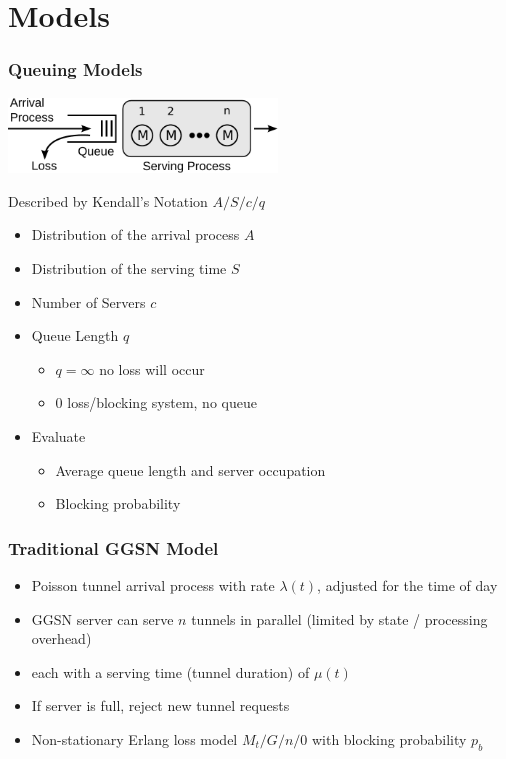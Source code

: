 \documentclass{beamer}
\begin{document}
\section{Models}

\begin{frame}
	\frametitle{Queuing Models}

	\begin{center}
		\includegraphics[height=2cm]{figures/kendall-model.pdf}
	\end{center}

	Described by Kendall's Notation $A/S/c/q$
	\begin{itemize}
	\item Distribution of the arrival process $A$
	\item Distribution of the serving time $S$
	\item Number of Servers $c$
	\item Queue Length $q$
	\begin{itemize}
		\item $q=\infty$ no loss will occur
		\item $0$ loss/blocking system, no queue
	\end{itemize}
	\item Evaluate
		\begin{itemize}
			\item Average queue length and server occupation
			\item Blocking probability
		\end{itemize}
	\end{itemize}
\end{frame}


\begin{frame}
	\frametitle{Traditional GGSN Model}
		\begin{center}
		\resizebox{!}{3cm}{%
			
		}
		\end{center}

		\begin{itemize}
			\item Poisson tunnel arrival process with rate $\lambda(t)$, adjusted for the time of day
			\item GGSN server can serve $n$ tunnels in parallel (limited by state / processing overhead)
			\item each with a serving time (tunnel duration) of $\mu(t)$
			\item If server is full, reject new tunnel requests
			\item Non-stationary Erlang loss model $M_t/G/n/0$ with blocking probability $p_b$
		\end{itemize}

\end{frame}
\end{document}
